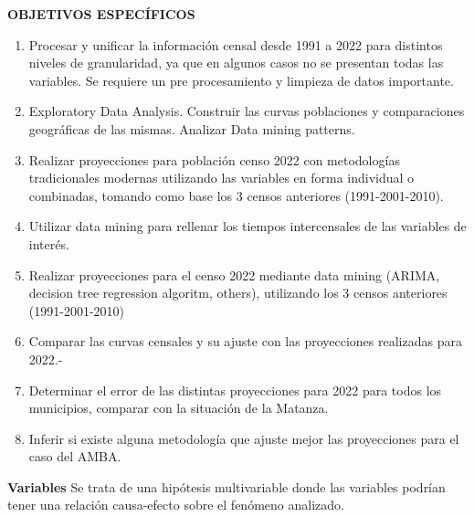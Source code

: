 \documentclass{article}
\theoremstyle{mytheoremstyle}
\theoremstyle{mytheoremstyle}
\theoremstyle{myproblemstyle}
\begin{document}
\textbf{OBJETIVOS ESPECÍFICOS}
\begin{enumerate}
  \item Procesar y unificar la información censal desde 1991 a 2022 para distintos niveles de granularidad, ya que en algunos casos no se presentan todas las variables.  Se requiere un pre procesamiento y limpieza de datos importante.
  \item Exploratory Data Analysis. Construir las curvas poblaciones y comparaciones geográficas de las mismas. Analizar Data mining patterns.
  \item Realizar proyecciones para población censo 2022 con metodologías tradicionales modernas utilizando las variables en forma individual o combinadas, tomando como base los 3 censos anteriores (1991-2001-2010).
  \item Utilizar data mining para rellenar los tiempos intercensales de las variables de interés.
  \item Realizar proyecciones para el censo 2022 mediante data mining (ARIMA, decision tree regression algoritm, others), utilizando los 3 censos anteriores (1991-2001-2010)
  \item Comparar las curvas censales y su ajuste con las proyecciones realizadas para 2022.-
  \item Determinar el error de las distintas proyecciones para 2022 para todos los municipios, comparar con la situación de la Matanza.  
  \item Inferir si existe alguna metodología que ajuste mejor las proyecciones para el caso del AMBA.
\end{enumerate}
\textbf{Variables}
Se trata de una hipótesis multivariable donde las variables podrían tener una relación causa-efecto sobre el fenómeno analizado.
\end{document}
